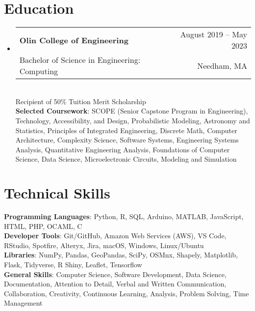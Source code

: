 \documentclass[letterpaper,10pt]{article}
\makeatletter
\newcommand{\resumeSubheading}[4]{
  \vspace{-2pt}\item
    \begin{tabular*}{0.97\textwidth}[t]{l@{\extracolsep{\fill}}r}
      \textbf{#1} & #2 \\
      \small#3 & \small #4 \\
    \end{tabular*}\vspace{-7pt}
}
\newcommand{\resumeSubHeadingListStart}{\begin{itemize}[leftmargin=0.15in, label={}]}
\newcommand{\resumeSubHeadingListEnd}{\end{itemize}}
\makeatother
\begin{document}
\section{Education}
  \resumeSubHeadingListStart
    \resumeSubheading
      {Olin College of Engineering}{August 2019 -- May 2023}
      {Bachelor of Science in Engineering: Computing}{Needham, MA} 
      \vspace{2pt} \\
      \small Recipient of 50\% Tuition Merit Scholarship \normalsize\\
      \vspace{2pt}
      \textbf{Selected Coursework}{\small: SCOPE (Senior Capstone Program in Engineering), Technology, Accessibility, and Design, Probabilistic Modeling, Astronomy and Statistics, Principles of Integrated Engineering, Discrete Math, Computer Architecture, Complexity Science, Software Systems, Engineering Systems Analysis, Quantitative Engineering Analysis, Foundations of Computer Science, Data Science, Microelectronic Circuits, Modeling and Simulation\normalsize}
  \resumeSubHeadingListEnd




%
\section{Technical Skills}
 \begin{itemize}[leftmargin=0.15in, label={}]
    \small{\item{
     \textbf{Programming Languages}{: Python, R, SQL, Arduino, MATLAB, JavaScript, HTML, PHP, OCAML, C} \\
     \textbf{Developer Tools}{: Git/GitHub, Amazon Web Services (AWS), VS Code, RStudio, Spotfire, Alteryx, Jira, macOS, Windows, Linux/Ubuntu} \\
     \textbf{Libraries}{: NumPy, Pandas, GeoPandas, SciPy, OSMnx, Shapely, Matplotlib, Flask, Tidyverse, R Shiny, Leaflet, Tensorflow} \\
     \textbf{General Skills}{: Computer Science, Software Development, Data Science, Documentation, Attention to Detail, Verbal and Written Communication, Collaboration, Creativity, Continuous Learning, Analysis, Problem Solving, Time Management
    }}}
 \end{itemize}


\end{document}
